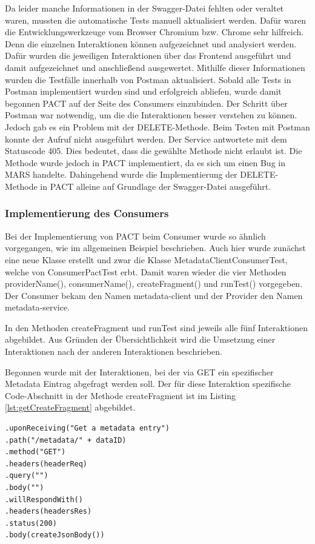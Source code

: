 \documentclass{llncs}
\begin{document}
Da leider manche Informationen in der Swagger-Datei fehlten oder veraltet waren, mussten die automatische Tests manuell aktualisiert werden. Dafür waren die Entwicklungswerkzeuge vom Browser Chromium bzw. Chrome sehr hilfreich. Denn die einzelnen Interaktionen können aufgezeichnet und analysiert werden. Dafür wurden die jeweiligen Interaktionen über das Frontend ausgeführt und damit aufgezeichnet und anschließend ausgewertet. Mithilfe dieser Informationen wurden die Testfälle innerhalb von Postman aktualisiert. Sobald alle Tests in Postman implementiert wurden sind und erfolgreich abliefen, wurde damit begonnen PACT auf der Seite des Consumers einzubinden. Der Schritt über Postman war notwendig, um die die Interaktionen besser verstehen zu können. Jedoch gab es ein Problem mit der DELETE-Methode. Beim Testen mit Postman konnte der Aufruf nicht ausgeführt werden. Der Service antwortete mit dem Statuscode 405. Dies bedeutet, dass die gewählte Methode nicht erlaubt ist. Die Methode wurde jedoch in PACT implementiert, da es sich um einen Bug in MARS handelte. Dahingehend wurde die Implementierung der DELETE-Methode in PACT alleine auf Grundlage der Swagger-Datei ausgeführt.

\subsubsection{Implementierung des Consumers}
Bei der Implementierung von PACT beim Consumer wurde so ähnlich vorgegangen, wie im allgemeinen Beispiel beschrieben. Auch hier wurde zunächst eine neue Klasse erstellt und zwar die Klasse MetadataClientConsumerTest, welche von ConsumerPactTest erbt. Damit waren wieder die vier Methoden providerName(), consumerName(), createFragment() und runTest() vorgegeben. Der Consumer bekam den Namen metadata-client und der Provider den Namen metadata-service. 

In den Methoden createFragment und runTest sind jeweils alle fünf Interaktionen abgebildet. Aus Gründen der Übersichtlichkeit wird die Umsetzung einer Interaktionen nach der anderen Interaktionen beschrieben.

Begonnen wurde mit der Interaktionen, bei der via GET ein spezifischer Metadata Eintrag abgefragt werden soll.
Der für diese Interaktion spezifische Code-Abschnitt in der Methode createFragment ist im Listing \ref{lst:getCreateFragment} abgebildet.

\lstset{language = Java}
\begin{lstlisting}[caption=createFragment für die GET-Methode,label=lst:getCreateFragment]
.uponReceiving("Get a metadata entry")
.path("/metadata/" + dataID)
.method("GET")
.headers(headerReq)
.query("")
.body("")
.willRespondWith()
.headers(headersRes)
.status(200)
.body(createJsonBody())
\end{lstlisting}
\end{document}
